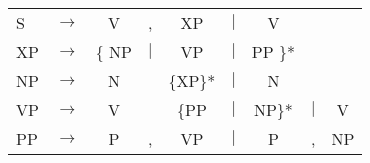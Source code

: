 \documentclass[12pt,a4paper]{article}
\begin{document}
\begin{singlespace}
\begin{tabular}{ l  l  c  c  c  c  c  c  c}
S & $\rightarrow$ & V & , & XP & $\mid$ & V \\
XP & $\rightarrow$ & \{ NP & $\mid$ &  VP & $\mid$ & PP \}* \\
   NP & $\rightarrow$ & N & & \{XP\}* & $\mid$ & N \\
VP & $\rightarrow$ & V & & \{PP & $\mid$     & NP\}* & $\mid$ & V \\
   PP & $\rightarrow$ & P & , & VP & $\mid$  & P & ,   & NP \\
\end{tabular}\\
\newline
\end{singlespace}
\end{document}
